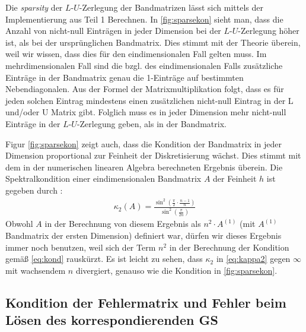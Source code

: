 \documentclass[smallheadings]{scrartcl}
\numberwithin{equation}{section}
\begin{document}
Die \textit{sparsity} der $L$-$U$-Zerlegung der Bandmatrizen lässt sich mittels der Implementierung aus Teil 1 Berechnen. In \ref{fig:sparsekon} sieht man, dass die Anzahl von nicht-null Einträgen in jeder Dimension bei der $L$-$U$-Zerlegung höher ist, als bei der ursprünglichen Bandmatrix. Dies stimmt mit der Theorie überein, weil wir wissen, dass dies für den eindimensionalen Fall gelten muss. Im mehrdimensionalen Fall sind die bzgl. des eindimensionalen Falls zusätzliche Einträge in der Bandmatrix genau die 1-Einträge auf bestimmten Nebendiagonalen. Aus der Formel der Matrixmultiplikation folgt, dass es für jeden solchen Eintrag mindestens einen zusätzlichen nicht-null Eintrag in der L und/oder U Matrix gibt. Folglich muss es in jeder Dimension mehr nicht-null Einträge in der $L$-$U$-Zerlegung geben, als in der Bandmatrix.

Figur \ref{fig:sparsekon} zeigt auch, dass die Kondition der Bandmatrix in jeder Dimension proportional zur Feinheit der Diskretisierung wächst. Dies stimmt mit dem in der numerischen linearen Algebra berechneten Ergebnis überein. Die Spektralkondition einer eindimensionalen Bandmatrix $A$ der Feinheit $h$ ist gegeben durch \cite{aufg6.2}:
\begin{align}
\kappa_2(A) = \frac{\sin^2(\frac{\pi}{2}\cdot\frac{n-1}{n})}{\sin^2(\frac{\pi}{2n})}
\label{eq:kappa2}
\end{align}
Obwohl $A$ in der Berechnung von diesem Ergebnis als $n^2\cdot A^{(1)}$ (mit $A^{(1)}$ Bandmatrix der ersten Dimension) definiert war, dürfen wir dieses Ergebnis immer noch benutzen, weil sich der Term $n^2$ in der Berechnung der Kondition gemäß \ref{eq:kond} rauskürzt. Es ist leicht zu sehen, dass $\kappa_2$ in \ref{eq:kappa2} gegen $\infty$ mit wachsendem $n$ divergiert, genauso wie die Kondition in \ref{fig:sparsekon}.

%

\subsection{Kondition der Fehlermatrix und Fehler beim Lösen des korrespondierenden GS}
\end{document}
